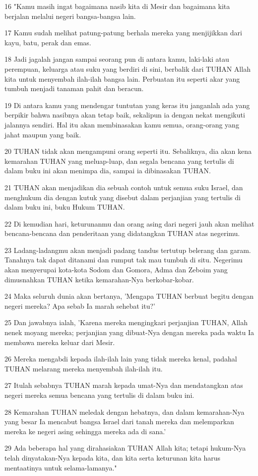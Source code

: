 \par 16 "Kamu masih ingat bagaimana nasib kita di Mesir dan bagaimana kita berjalan melalui negeri bangsa-bangsa lain.
\par 17 Kamu sudah melihat patung-patung berhala mereka yang menjijikkan dari kayu, batu, perak dan emas.
\par 18 Jadi jagalah jangan sampai seorang pun di antara kamu, laki-laki atau perempuan, keluarga atau suku yang berdiri di sini, berbalik dari TUHAN Allah kita untuk menyembah ilah-ilah bangsa lain. Perbuatan itu seperti akar yang tumbuh menjadi tanaman pahit dan beracun.
\par 19 Di antara kamu yang mendengar tuntutan yang keras itu janganlah ada yang berpikir bahwa nasibnya akan tetap baik, sekalipun ia dengan nekat mengikuti jalannya sendiri. Hal itu akan membinasakan kamu semua, orang-orang yang jahat maupun yang baik.
\par 20 TUHAN tidak akan mengampuni orang seperti itu. Sebaliknya, dia akan kena kemarahan TUHAN yang meluap-luap, dan segala bencana yang tertulis di dalam buku ini akan menimpa dia, sampai ia dibinasakan TUHAN.
\par 21 TUHAN akan menjadikan dia sebuah contoh untuk semua suku Israel, dan menghukum dia dengan kutuk yang disebut dalam perjanjian yang tertulis di dalam buku ini, buku Hukum TUHAN.
\par 22 Di kemudian hari, keturunanmu dan orang asing dari negeri jauh akan melihat bencana-bencana dan penderitaan yang didatangkan TUHAN atas negerimu.
\par 23 Ladang-ladangmu akan menjadi padang tandus tertutup belerang dan garam. Tanahnya tak dapat ditanami dan rumput tak mau tumbuh di situ. Negerimu akan menyerupai kota-kota Sodom dan Gomora, Adma dan Zeboim yang dimusnahkan TUHAN ketika kemarahan-Nya berkobar-kobar.
\par 24 Maka seluruh dunia akan bertanya, 'Mengapa TUHAN berbuat begitu dengan negeri mereka? Apa sebab Ia marah sehebat itu?'
\par 25 Dan jawabnya ialah, 'Karena mereka mengingkari perjanjian TUHAN, Allah nenek moyang mereka; perjanjian yang dibuat-Nya dengan mereka pada waktu Ia membawa mereka keluar dari Mesir.
\par 26 Mereka mengabdi kepada ilah-ilah lain yang tidak mereka kenal, padahal TUHAN melarang mereka menyembah ilah-ilah itu.
\par 27 Itulah sebabnya TUHAN marah kepada umat-Nya dan mendatangkan atas negeri mereka semua bencana yang tertulis di dalam buku ini.
\par 28 Kemarahan TUHAN meledak dengan hebatnya, dan dalam kemarahan-Nya yang besar Ia mencabut bangsa Israel dari tanah mereka dan melemparkan mereka ke negeri asing sehingga mereka ada di sana.'
\par 29 Ada beberapa hal yang dirahasiakan TUHAN Allah kita; tetapi hukum-Nya telah dinyatakan-Nya kepada kita, dan kita serta keturunan kita harus mentaatinya untuk selama-lamanya."


